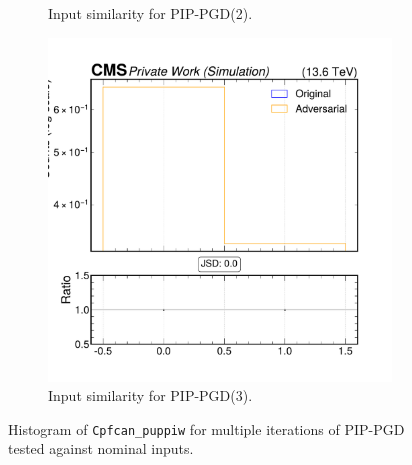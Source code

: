 \begin{figure}[h]
\begin{subfigure}[t]{0.32\textwidth}
    \caption*{Input similarity for PIP-PGD(2).}
  \end{subfigure}\hfill
  \begin{subfigure}[t]{0.32\textwidth}
    \includegraphics[width=\linewidth]{media/output/features/compare/combined_it_3/cmp_cpf_arr_Cpfcan_puppiw.pdf}
    \caption*{Input similarity for PIP-PGD(3).}
  \end{subfigure}

  \caption*{Histogram of \texttt{Cpfcan\_puppiw} for multiple iterations of PIP-PGD tested against nominal inputs.}
  \label{fig:combined_input_Cpfcan_puppiw}
\end{figure}

